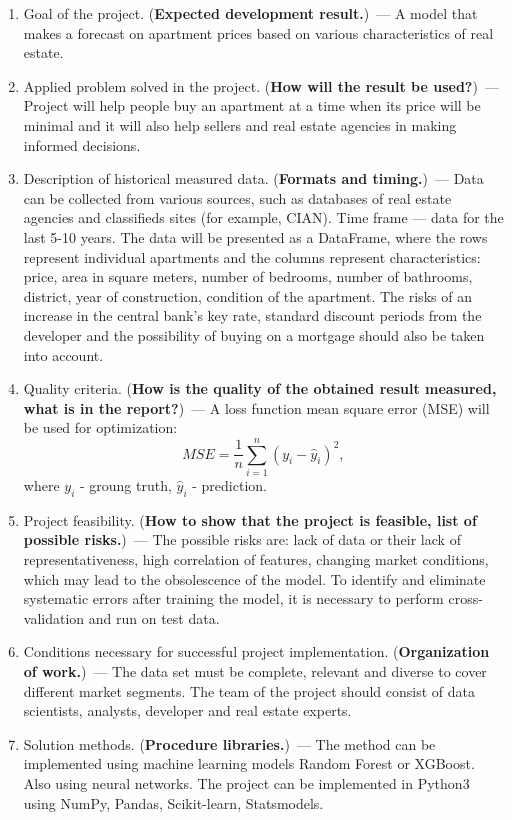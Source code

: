 \documentclass[12pt]{article}
\begin{document}
\begin{enumerate}
\item Goal of the project. (\textbf{Expected development result.})~---
A model that makes a forecast on apartment prices based on various characteristics of real estate.
\item Applied problem solved in the project. (\textbf{How will the result be used?})~--- Project will help people buy an apartment at a time when its price will be minimal and it will also help sellers and real estate agencies in making informed decisions.
\item Description of historical measured data. (\textbf{Formats and timing.})~--- Data can be collected from various sources, such as databases of real estate agencies and classifieds sites (for example, CIAN). Time frame — data for the last 5-10 years.  The data will be presented as a DataFrame, where the rows represent individual apartments and the columns represent characteristics: price, area in square meters, number of bedrooms, number of bathrooms, district, year of construction, condition of the apartment. 
The risks of an increase in the central bank's key rate, standard discount periods from the developer and the possibility of buying on a mortgage should also be taken into account.
\item Quality criteria. (\textbf{How is the quality of the obtained result measured, what is in the report?})~--- A loss function mean square error (MSE) will be used for optimization: 
\begin{equation}
MSE = \frac{1}{n} \sum_{i=1}^{n} (y_i - \hat{y}_i)^2,
\end{equation}
where {$y_i$} - groung truth,  {$\hat{y}_i$} - prediction.

\item Project feasibility. (\textbf{How to show that the project is feasible, list of possible risks.})~--- The possible risks are: lack of data or their lack of representativeness, high correlation of features, changing market conditions, which may lead to the obsolescence of the model. To identify and eliminate  systematic errors after training the model, it is necessary to perform cross-validation and run on test data.
\item Conditions necessary for successful project implementation. (\textbf{Organization of work.})~--- The data set must be complete, relevant and diverse to cover different market segments. The team of the project should consist of data scientists, analysts, developer and real estate experts. 
\item Solution methods. (\textbf{Procedure libraries.})~--- The method can be implemented using machine learning models Random Forest or XGBoost. Also using neural networks. The project can be implemented in Python3 using 
NumPy, Pandas, Scikit-learn, Statsmodels.
\end{enumerate}
\end{document}
